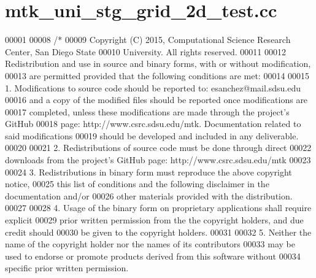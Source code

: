 \hypertarget{mtk__uni__stg__grid__2d__test_8cc_source}{\section{mtk\+\_\+uni\+\_\+stg\+\_\+grid\+\_\+2d\+\_\+test.\+cc}
\label{mtk__uni__stg__grid__2d__test_8cc_source}
}

\begin{DoxyCode}
00001 
00008 \textcolor{comment}{/*}
00009 \textcolor{comment}{Copyright (C) 2015, Computational Science Research Center, San Diego State}
00010 \textcolor{comment}{University. All rights reserved.}
00011 \textcolor{comment}{}
00012 \textcolor{comment}{Redistribution and use in source and binary forms, with or without modification,}
00013 \textcolor{comment}{are permitted provided that the following conditions are met:}
00014 \textcolor{comment}{}
00015 \textcolor{comment}{1. Modifications to source code should be reported to: esanchez@mail.sdsu.edu}
00016 \textcolor{comment}{and a copy of the modified files should be reported once modifications are}
00017 \textcolor{comment}{completed, unless these modifications are made through the project's GitHub}
00018 \textcolor{comment}{page: http://www.csrc.sdsu.edu/mtk. Documentation related to said modifications}
00019 \textcolor{comment}{should be developed and included in any deliverable.}
00020 \textcolor{comment}{}
00021 \textcolor{comment}{2. Redistributions of source code must be done through direct}
00022 \textcolor{comment}{downloads from the project's GitHub page: http://www.csrc.sdsu.edu/mtk}
00023 \textcolor{comment}{}
00024 \textcolor{comment}{3. Redistributions in binary form must reproduce the above copyright notice,}
00025 \textcolor{comment}{this list of conditions and the following disclaimer in the documentation and/or}
00026 \textcolor{comment}{other materials provided with the distribution.}
00027 \textcolor{comment}{}
00028 \textcolor{comment}{4. Usage of the binary form on proprietary applications shall require explicit}
00029 \textcolor{comment}{prior written permission from the the copyright holders, and due credit should}
00030 \textcolor{comment}{be given to the copyright holders.}
00031 \textcolor{comment}{}
00032 \textcolor{comment}{5. Neither the name of the copyright holder nor the names of its contributors}
00033 \textcolor{comment}{may be used to endorse or promote products derived from this software without}
00034 \textcolor{comment}{specific prior written permission.}

\end{DoxyCode}
